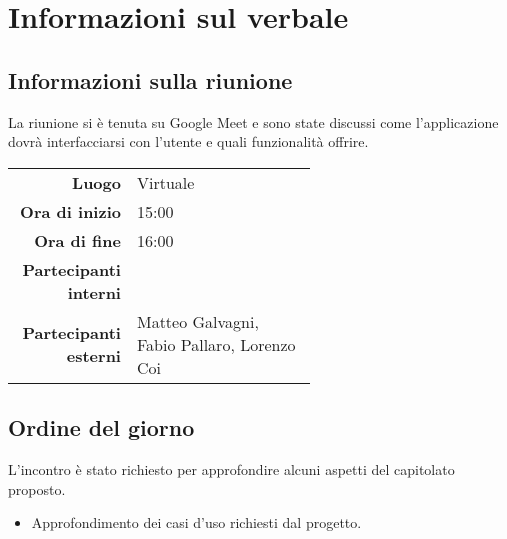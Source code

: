 \section{Informazioni sul verbale}

\subsection{Informazioni sulla riunione}
La riunione si è tenuta su Google Meet e sono state discussi come l'applicazione dovrà interfacciarsi con l'utente e quali funzionalità offrire.

\begin{center}
	\begin{tabular}{r|p{0.6\linewidth}}
		\toprule
		\textbf{Luogo} & Virtuale \\
		\textbf{Ora di inizio} & 15:00 \\
		\textbf{Ora di fine} & 16:00 \\
		\textbf{Partecipanti interni} & \groupTeam \\
		\textbf{Partecipanti esterni} & Matteo Galvagni, Fabio Pallaro, Lorenzo Coi
	\end{tabular}
\end{center}

\medskip

\subsection{Ordine del giorno}
L'incontro è stato richiesto per approfondire alcuni aspetti del capitolato proposto.
\begin{itemize}
	\item Approfondimento dei casi d'uso richiesti dal progetto.
\end{itemize}
